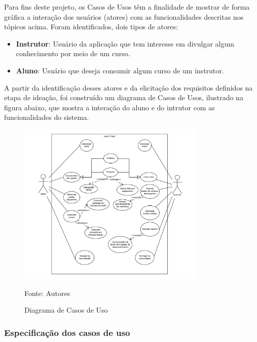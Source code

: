         Para fins deste projeto, os Casos de Usos têm a finalidade de mostrar de forma gráfica a interação dos usuários (atores) com as funcionalidades descritas nos tópicos acima. Foram identificados, dois tipos de atores:
        
        \begin{itemize}
            \item \textbf{Instrutor}: Usuário da aplicação que tem interesse em divulgar algum conhecimento por meio de um curso.
            \item \textbf{Aluno}: Usuário que deseja consumir algum curso de um instrutor.
        \end{itemize}

        A partir da identificação desses atores e da elicitação dos requisitos definidos na etapa de ideação, foi construído um diagrama de Casos de Usos, ilustrado na figura abaixo, que mostra a interação do aluno e do intrutor com as funcionalidades do sistema.

        \begin{figure}[h]
            \centering
            \caption{Diagrama de Casos de Uso}
            \includegraphics[width=0.8\textwidth]{figuras/uml.png}
            \begin{center}
                {\footnotesize Fonte: Autores}
            \end{center}
            \label{fig:exemplo}
        \end{figure}
        
        \subsubsection{Especificação dos casos de uso}

